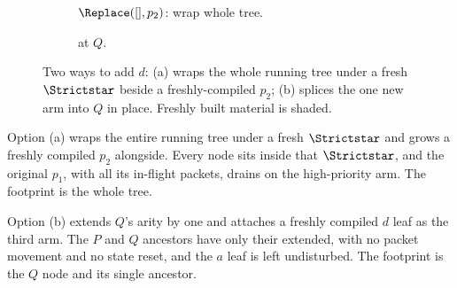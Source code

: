 \begin{figure}[t]
  \centering
  \begin{subfigure}[t]{0.56\linewidth}
    \centering
    \caption{\(\Replace([], p_2)\): wrap whole tree.}
    \label{fig:planner-replace}
  \end{subfigure}\hfill
  \begin{subfigure}[t]{0.4\linewidth}
    \centering
    \caption{\Add{} at \(Q\).}
    \label{fig:planner-add}
  \end{subfigure}
  \caption{Two ways to add \(d\): (a) \Replace{} wraps the whole running tree under a fresh \(\Strictstar\) beside a freshly-compiled \(p_2\); (b) \Add{} splices the one new arm into \(Q\) in place. Freshly built material is shaded.}
  \label{fig:planner-add-vs-replace}
\end{figure}

Option (a) wraps the entire running tree under a fresh \(\Strictstar\) and grows a freshly compiled \(p_2\) alongside.
Every node sits inside that \(\Strictstar\), and the original \(p_1\), with all its in-flight packets, drains on the high-priority arm.
The footprint is the whole tree.

Option (b) extends \(Q\)'s arity by one and attaches a freshly compiled \(d\) leaf as the third arm.
The \(P\) and \(Q\) ancestors have only their \zz extended, with no packet movement and no state reset, and the \(a\) leaf is left undisturbed.
The footprint is the \(Q\) node and its single ancestor.

